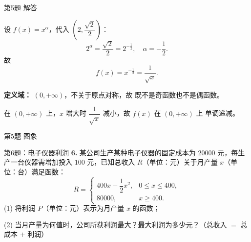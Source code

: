 \documentclass[10pt,aspectratio=169,serif,fleqn]{beamer}
\begin{document}
\begin{frame}[t]{第5题 解答}
	
\vspace{-2em}
\begin{tcolorbox}[colback=orange!10,colframe=orange,title=\textbf{解}]
设 $f(x)=x^{\alpha}$，代入 $\left(2,\dfrac{\sqrt{2}}{2}\right)$：
\[
2^{\alpha}=\frac{\sqrt2}{2}=2^{-\frac12},\quad \alpha=-\frac12.
\]
故
\[
f(x)=x^{-\frac12}=\frac{1}{\sqrt{x}}.
\]

\vspace{0.3em}
\textbf{定义域：} $(0,+\infty)$，不关于原点对称，故 \alert{既不是奇函数也不是偶函数}。

\vspace{0.3em}
在 $(0,+\infty)$ 上，$x$ 增大时 $\dfrac{1}{\sqrt{x}}$ 减小，故 $f(x)$ 在 $(0,+\infty)$ 上 \alert{单调递减}。
\end{tcolorbox}
\end{frame}

\begin{frame}[t]{第5题 图象}
\begin{center}
\end{center}
\end{frame}

\begin{frame}[t]{第6题：电子仪器利润}
\textbf{6.} 某公司生产某种电子仪器的固定成本为 $20000$ 元，每生产一台仪器需增加投入 $100$ 元，已知总收入 $R$（单位：元）关于月产量 $x$（单位：台）满足函数：
\[
R=\begin{cases}
400x-\dfrac12x^2, & 0\le x\le400,\\
80000, & x\ge400.
\end{cases}
\]
(1) 将利润 $P$（单位：元）表示为月产量 $x$ 的函数；

(2) 当月产量为何值时，公司所获利润最大？最大利润为多少元？（总收入 $=$ 总成本 $+$ 利润）
\end{frame}
\end{document}
